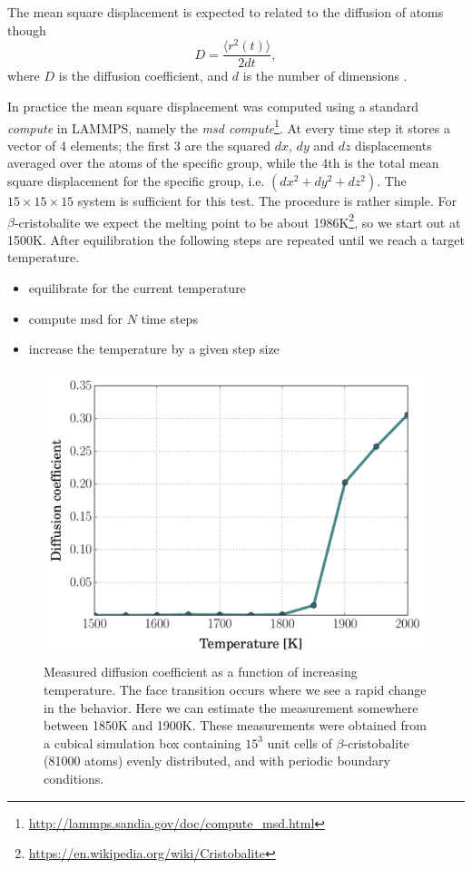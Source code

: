 \documentclass[twoside,english]{uiofysmaster}
\begin{document}
The mean square displacement is expected to related to the diffusion of atoms though
\begin{equation}
	D = \frac{\langle r^2(t)\rangle}{2dt},
\end{equation}
where $D$ is the diffusion coefficient, and $d$ is the number of dimensions \cite{EinsteinBrowninanMotion}. 

In practice the mean square displacement was computed using a standard \textit{compute} in LAMMPS, namely the \textit{msd compute}\footnote{\url{http://lammps.sandia.gov/doc/compute_msd.html}}. 
At every time step it stores a vector of 4 elements; the first 3 are the squared $dx$, $dy$ and $dz$ displacements averaged over the atoms of the specific group, while the 4th is the total mean square displacement for the specific group, i.e. $(dx^2 + dy^2 + dz^2)$. 
The $15\times15\times15$ system is sufficient for this test. The procedure is rather simple. For $\beta$-cristobalite we expect the melting point to be about 1986K\footnote{\url{https://en.wikipedia.org/wiki/Cristobalite}}, so we start out at 1500K. After equilibration the following steps are repeated until we reach a target temperature. 
\begin{itemize}
	\item equilibrate for the current temperature
	\item compute msd for $N$ time steps
	\item increase the temperature by a given step size
\end{itemize}

\begin{figure}[H]
\centering
\includegraphics[width=0.7\linewidth]{../SiO2/msd/figures/msd}
\caption{Measured diffusion coefficient as a function of increasing temperature. 
	The face transition occurs where we see a rapid change in the behavior. 
	Here we can estimate the measurement somewhere between 1850K and 1900K. 
	These measurements were obtained from a cubical simulation box containing $15^3$ unit cells of $\beta$-cristobalite (81000 atoms) evenly distributed, and with periodic boundary conditions.}
\label{fig:msd}
\end{figure}
\end{document}
